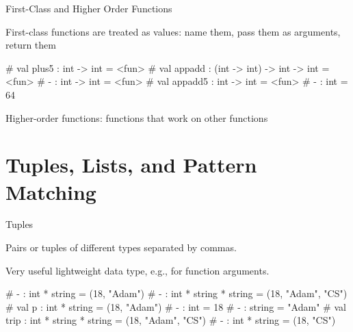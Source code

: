 \documentclass{plt}
\begin{document}
\begin{frame}[fragile]{First-Class and Higher Order Functions}

  First-class functions are treated as values: name them, pass them as arguments,
  return them

\begin{interactive}
# 
val plus5 : int -> int = <fun>
# 
val appadd : (int -> int) -> int -> int = <fun>
# 
- : int -> int = <fun>
# 
val appadd5 : int -> int = <fun>
# 
- : int = 64
\end{interactive}
Higher-order functions: functions that work on other functions


\end{frame}

\part{Tuples, Lists, and Pattern Matching}

\begin{frame}[fragile]{Tuples}

Pairs or tuples of different types separated by commas.

Very useful lightweight data type, e.g., for function arguments.

\begin{interactive}
# 
- : int * string = (18, "Adam")
# 
- : int * string * string = (18, "Adam", "CS")
# 
val p : int * string = (18, "Adam")
# 
- : int = 18
# 
- : string = "Adam"
# 
val trip : int * string * string = (18, "Adam", "CS")
# 
- : int * string = (18, "CS")
\end{interactive}

\end{frame}
\end{document}
